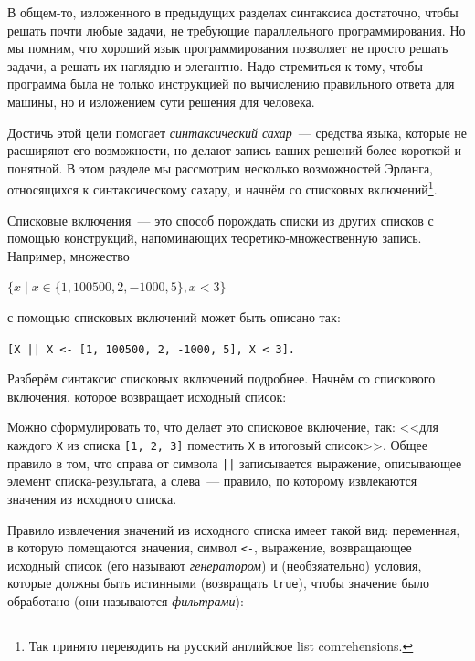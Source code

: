 \documentclass[
  paper=a4,
  fontsize=14pt,
  openany,
  appendixprefix=true
]{scrbook}
\begin{document}
В общем-то, изложенного в предыдущих разделах синтаксиса достаточно, чтобы решать почти любые задачи, не требующие параллельного программирования. Но мы помним, что хороший язык программирования позволяет не просто решать задачи, а решать их наглядно и элегантно. Надо стремиться к тому, чтобы программа была не только инструкцией по вычислению правильного ответа для машины, но и изложением сути решения для человека.

Достичь этой цели помогает {\em синтаксический сахар}~--- средства языка, которые не расширяют его возможности, но делают запись ваших решений более короткой и понятной. В этом разделе мы рассмотрим несколько возможностей Эрланга, относящихся к синтаксическому сахару, и начнём со списковых включений\footnote{Так принято переводить на русский английское list comrehensions.}.

Списковые включения~--- это способ порождать списки из других списков с помощью конструкций, напоминающих теоретико-множественную запись. Например, множество

$\{x \mid x\in \{1, 100500, 2, -1000, 5\}, x < 3\}$

с помощью списковых включений может быть описано так:

\lstinline{[X || X <- [1, 100500, 2, -1000, 5], X < 3].}

Разберём синтаксис списковых включений подробнее. Начнём со спискового включения, которое возвращает исходный список:


Можно сформулировать то, что делает это списковое включение, так: <<для каждого \lstinline{X} из списка \lstinline{[1, 2, 3]} поместить \lstinline{X} в итоговый список>>. Общее правило в том, что справа от символа \lstinline{||} записывается выражение, описывающее элемент списка-результата, а слева~--- правило, по которому извлекаются значения из исходного списка.

Правило извлечения значений из исходного списка имеет такой вид: переменная, в которую помещаются значения, символ \lstinline{<-}, выражение, возвращающее исходный список (его называют {\em генератором}) и (необзяательно) условия, которые должны быть истинными (возвращать \lstinline{true}), чтобы значение было обработано (они называются {\em фильтрами}):

\end{document}

